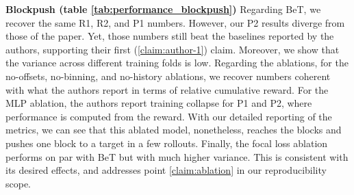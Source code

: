 \textbf{Blockpush (table \ref{tab:performance_blockpush})} 
Regarding BeT, we recover the same R1, R2, and P1 numbers. However, our P2 results diverge from those of the paper.
Yet, those numbers still beat the baselines reported by the authors, supporting their first (\ref{claim:author-1}) claim.
Moreover, we show that the variance across different training folds is low.
Regarding the ablations, for the no-offsets, no-binning, and no-history ablations, we recover numbers coherent with what the authors report in terms of relative cumulative reward.
For the MLP ablation, the authors report training collapse for P1 and P2, where performance is computed from the reward.
With our detailed reporting of the metrics, we can see that this ablated model, nonetheless, reaches the blocks and pushes one block to a target in a few rollouts.
Finally, the focal loss ablation performs on par with BeT but with much higher variance.
This is consistent with its desired effects, and addresses point \ref{claim:ablation} in our reproducibility scope.


